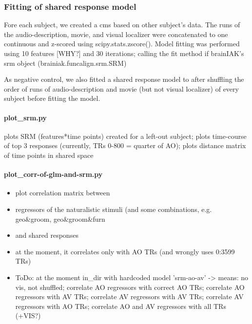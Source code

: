 \subsubsection{Fitting of shared response model}




Fore each subject, we created a \ac{cms} based on other subject's data.
%
The runs of the audio-description, movie, and visual localizer were concatenated
to one continuous and z-scored using scipy.stats.zscore().
Model fitting was performed using 10 features [WHY?] and 30 iterations;
calling the fit method if brainIAK's srm object (brainiak.funcalign.srm.SRM)

As negative control, we also fitted a shared response model to after shuffling
the order of runs of audio-description and movie (but not visual localizer) of
every subject before fitting the model.


\paragraph{plot\_srm.py}

%
plots SRM (features*time points) created for a left-out subject; plots
time-course of top 3 responses (currently, TRs 0-800 = quarter of AO); plots
distance matrix of time points in shared space


\paragraph{plot\_corr-of-glm-and-srm.py}
%
\begin{itemize}
    \item plot correlation matrix between
    \item regressors of the naturalistic stimuli (and some combinations, e.g.
        geo\&groom, geo\&groom\&furn
    \item and shared responses
    \item at the moment, it correlates only with AO TRs (and wrongly uses
        0:3599 TRs)
    \item ToDo: at the moment in\_dir with hardcoded model 'srm-ao-av'
    ->  means: no vis, not shuffled; correlate AO regressors with correct AO
        TRs; correlate AO regressors with AV TRs; correlate AV regressors with
        AV TRs; correlate AV regressors with AO TRs; correlate AO and AV
        regressors with all TRs (+VIS?)
\end{itemize}



